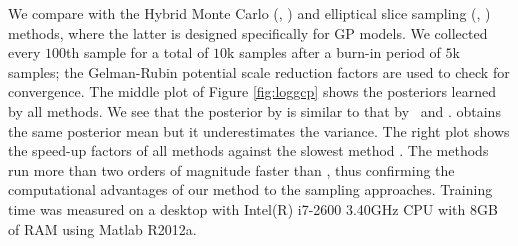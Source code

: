 We compare \agp \space with the  Hybrid Monte Carlo (\hmc, \cite{duane1987hybrid}) and 
elliptical slice sampling  (\ess, \cite{murray2009elliptical}) methods, where the latter is designed specifically for GP models.
We collected every $100$th sample for a total of $10$k samples after a burn-in period of $5$k samples; the  Gelman-Rubin potential scale reduction factors \citep{gelman1992inference} are used to check for convergence. 
The middle plot of Figure \ref{fig:loggcp} shows the posteriors learned by all methods.
 We see that the posterior by \agpfull \space is 
 similar to that 
by \hmc \ and \ess.
\agpmix \space obtains the same posterior mean but it underestimates the variance. 
The right plot shows the speed-up factors of all methods against the slowest method \hmc. %
The \agp \space methods run more than two orders of magnitude faster than \hmc, thus confirming the computational advantages of our method to the sampling approaches.
Training time was measured on a desktop with Intel(R) i7-2600 3.40GHz CPU with 8GB of RAM using Matlab R2012a.
